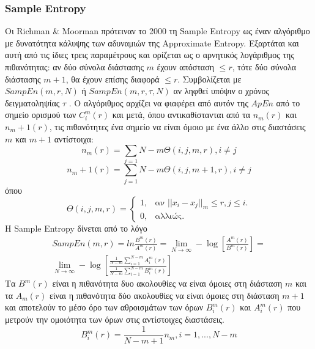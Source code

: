 \subsubsection{ \en Sample Entropy \gr}
Οι \en Richman \& Moorman \gr πρότειναν το 2000 τη \en Sample Entropy \gr ως έναν αλγόριθμο με δυνατότητα κάλυψης των αδυναμιών της \en Approximate Entropy. \gr Εξαρτάται και αυτή από τις ίδιες τρεις παραμέτρους και ορίζεται ως ο αρνητικός λογάριθμος της πιθανότητας: αν δύο σύνολα διάστασης $m$ έχουν απόσταση $\leq r$, τότε δύο σύνολα διάστασης $m + 1$, θα έχουν επίσης διαφορά $\leq r$. Συμβολίζεται με $SampEn(m, r, N)$ ή $SampEn(m, r, τ , N)$ αν ληφθεί υπόψιν ο χρόνος δειγματοληψίας $\tau$ . Ο αλγόριθμος αρχίζει να φιαφέρει από αυτόν της $ApEn$ από το σημείο ορισμού των $C_i ^ m (r)$ και μετά, όπου αντικαθίστανται από τα $n_m (r)$ και $n_m+1 (r)$, τις πιθανότητες ένα σημείο να είναι όμοιο με ένα άλλο στις διαστάσεις $m$ και $m+1$ αντίστοιχα:
\begin{equation}
	n_m (r) = \sum_{j=1}{N-m} \Theta (i, j, m, r), i \neq j
\end{equation}
\begin{equation}
	n_m+1 (r) = \sum_{j=1}{N-m} \Theta (i, j, m+1, r), i \neq j
\end{equation}
όπου
\begin{equation}
	\Theta (i, j, m, r) = \begin{cases}
		1, & \text{αν $||x_i - x_j||_m \leq r, j \leq i$}.\\
		0, & \text{αλλιώς}.
	\end{cases}
\end{equation}
Η \en Sample Entropy \gr δίνεται από το λόγο
\begin{equation}
	\begin{aligned}
		SampEn (m, r) = ln \frac{B^m (r)}{A^m (r)} = \lim_{N \to \infty} - \log [\frac{A^m (r)}{B^m (r)}] = \\ 
		\lim_{N \to \infty} - \log [\frac{\frac{1}{N-m} \sum_{i=1}^{N-m} A_i ^m (r)}{\frac{1}{N-m} \sum_{i=1}^{N-m} B_i ^m (r)}]
	\end{aligned}
\end{equation}
Τα $B^m (r)$ είναι η πιθανότητα δυο ακολουθίες να είναι όμοιες στη διάσταση $m$ και τα $A_m(r)$ είναι η πιθανότητα δύο ακολουθίες να είναι όμοιες στη διάσταση $m + 1$ και αποτελούν το μέσο όρο των αθροισμάτων των όρων $B_i ^m (r)$ και $Α_i ^m (r)$ που μετρούν την ομοιότητα των όρων στις αντίστοιχες διαστάσεις.
\begin{equation}
	B_i ^m (r) = \frac{1}{N - m + 1} n_m , i = 1, ..., N - m
\end{equation}

